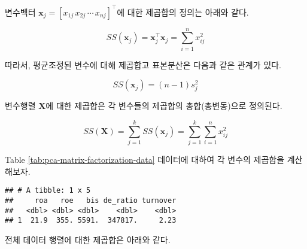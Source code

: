 \documentclass[]{book}
\newenvironment{Shaded}{\begin{snugshade}}{\end{snugshade}}
\newcommand{\CommentTok}[1]{\textcolor[rgb]{0.56,0.35,0.01}{\textit{#1}}}
\newcommand{\ControlFlowTok}[1]{\textcolor[rgb]{0.13,0.29,0.53}{\textbf{#1}}}
\newcommand{\DecValTok}[1]{\textcolor[rgb]{0.00,0.00,0.81}{#1}}
\newcommand{\KeywordTok}[1]{\textcolor[rgb]{0.13,0.29,0.53}{\textbf{#1}}}
\newcommand{\NormalTok}[1]{#1}
\newcommand{\OperatorTok}[1]{\textcolor[rgb]{0.81,0.36,0.00}{\textbf{#1}}}
\newcommand{\StringTok}[1]{\textcolor[rgb]{0.31,0.60,0.02}{#1}}
\begin{document}
변수벡터 \(\mathbf{x}_j = [x_{1j} \, x_{2j} \, \cdots \, x_{nj}]^\top\)에 대한 제곱합의 정의는 아래와 같다.

\begin{equation}
SS(\mathbf{x}_j) = \mathbf{x}_j^\top \mathbf{x}_j = \sum_{i = 1}^{n} x_{ij}^2
\end{equation}

따라서, 평균조정된 변수에 대해 제곱합고 표본분산은 다음과 같은 관계가 있다.

\begin{equation*}
SS(\mathbf{x}_j) = (n - 1) s_j^2
\end{equation*}

변수행렬 \(\mathbf{X}\)에 대한 제곱합은 각 변수들의 제곱합의 총합(총변동)으로 정의된다.

\begin{equation}
SS(\mathbf{X}) = \sum_{j = 1}^{k} SS(\mathbf{x}_j) = \sum_{j = 1}^{k} \sum_{i = 1}^{n} x_{ij}^2
\end{equation}

Table \ref{tab:pca-matrix-factorization-data} 데이터에 대하여 각 변수의 제곱합을 계산해보자.

\begin{Shaded}
\end{Shaded}

\begin{verbatim}
## # A tibble: 1 x 5
##     roa   roe   bis de_ratio turnover
##   <dbl> <dbl> <dbl>    <dbl>    <dbl>
## 1  21.9  355. 5591.  347817.     2.23
\end{verbatim}

전체 데이터 행렬에 대한 제곱합은 아래와 같다.

\begin{Shaded}
\end{Shaded}
\end{document}
